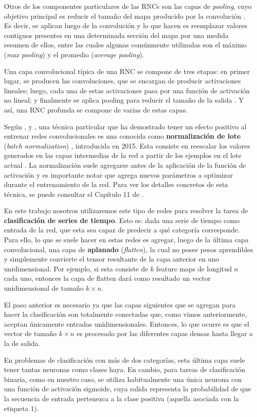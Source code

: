 \documentclass[../../main.tex]{subfiles}
\begin{document}
Otros de los componentes particulares de las RNCs son las capas de \textit{pooling}, cuyo
objetivo principal es reducir el tamaño del mapa producido por la convolución
\cite{hands-on-ML-sklearn-tf}. Es decir, se aplican luego de la convolución y lo que hacen
es reemplazar valores contiguos presentes en una determinada sección del mapa por una medida
resumen de ellos, entre las cuales algunas comúnmente utilizadas son el máximo
(\textit{max pooling}) y el promedio (\textit{average pooling}).

Una capa convolucional típica de una RNC se compone de tres etapas: en primer lugar, se
producen las convoluciones, que se encargan de producir activaciones lineales; luego, cada
una de estas activaciones pasa por una función de activación no lineal; y finalmente se
aplica pooling para reducir el tamaño de la salida \cite{deep-learning}. Y así, una RNC
profunda se compone de varias de estas capas.

Según \cite{deep-learning}, \cite{hands-on-ML-sklearn-tf} y \cite{batch-norm}, una técnica
particular que ha demostrado tener un efecto positivo al entrenar redes convolucionales es
una conocida como \textbf{normalización de lote} (\textit{batch normalization})
\cite{batch-norm}, introducida en 2015. Esta consiste en reescalar los valores generados
en las capas intermedias de la red a partir de los ejemplos en el lote actual
\cite{ai-a-modern-approach}. La normalización suele agregarse antes de la aplicación de la
función de activación y es importante notar que agrega nuevos parámetros a optimizar
durante el entrenamiento de la red. Para ver los detalles concretos de esta técnica, se
puede consultar el Capítulo 11 de \cite{hands-on-ML-sklearn-tf}.

\bigskip
En este trabajo nosotros utilizaremos este tipo de redes para resolver la tarea de
\textbf{clasificación de series de tiempo}. Esto es: dada una serie de tiempo como entrada
de la red, que esta sea capaz de predecir a qué categoría corresponde. Para ello, lo que
se suele hacer en estas redes es agregar, luego de la última capa convolucional, una capa
de \textbf{aplanado} (\textit{flatten}), la cual no posee pesos aprendibles y simplemente
convierte el tensor resultante de la capa anterior en uno unidimensional. Por ejemplo, si
esta consiste de \(k\) feature maps de longitud \(n\) cada uno, entonces la capa de
flatten dará como resultado un vector unidimensional de tamaño \(k \times n\).

El paso anterior es necesario ya que las capas siguientes que se agregan para hacer la
clasificación son totalmente conectadas que, como vimos anteriormente, aceptan únicamente
entradas unidimensionales. Entonces, lo que ocurre es que el vector de tamaño \(k \times
n\) es procesado por las diferentes capas densas hasta llegar a la de salida.

En problemas de clasificación con más de dos categorías, esta última capa suele tener
tantas neuronas como clases haya. En cambio, para tareas de clasificación binaria, como en
nuestro caso, se utiliza habitualmente una única neurona con una función de activación
sigmoide, cuya salida representa la probabilidad de que la secuencia de entrada pertenezca
a la clase positiva (aquella asociada con la etiqueta 1).
\end{document}
